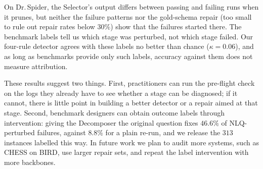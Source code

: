 \documentclass{llncs}
\begin{document}
On Dr.\,Spider, the Selector's output differs between passing and failing
runs when it prunes, but neither the failure patterns nor the gold-schema
repair (too small to rule out repair rates below $30\%$) show that the
failures started there. The benchmark labels tell us which stage was
perturbed, not which stage failed. Our four-rule detector agrees with these
labels no better than chance ($\kappa = 0.06$), and as long as benchmarks
provide only such labels, accuracy against them does not measure
attribution.

These results suggest two things. First, practitioners can run the
pre-flight check on the logs they already have to see whether a stage can
be diagnosed; if it cannot, there is little point in building a better
detector or a repair aimed at that stage. Second, benchmark designers can
obtain outcome labels through intervention: giving the Decomposer the
original question fixes $46.6\%$ of NLQ-perturbed failures, against $8.8\%$
for a plain re-run, and we release the $313$ instances labelled this way.
In future work we plan to audit more systems, such as CHESS on BIRD, use
larger repair sets, and repeat the label intervention with more backbones.





\end{document}
